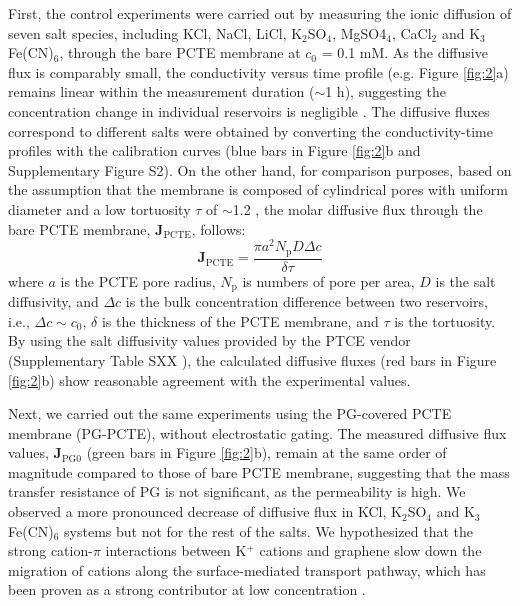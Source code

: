\documentclass[manuscript=letter, email=true, hyperref=true, keywords=false]{achemso}
\begin{document}
First, the control experiments were carried out by measuring the ionic
diffusion of seven salt species, including KCl, NaCl, LiCl,
K$_{2}$SO$_{4}$, MgSO4$_{4}$, CaCl$_{2}$ and K$_{3}$Fe(CN)$_{6}$,
through the bare PCTE membrane at $c_{0}$ = 0.1 mM. As the diffusive
flux is comparably small, the conductivity versus time profile
(e.g. Figure \ref{fig:2}a) remains linear within the measurement
duration ($\sim{}$1 h), suggesting the concentration change in
individual reservoirs is negligible . The diffusive
fluxes correspond to different salts were obtained by converting the
conductivity-time profiles with the calibration curves (blue bars in
Figure \ref{fig:2}b and Supplementary Figure S2). On the other hand,
for comparison purposes, based on the assumption that the membrane is
composed of cylindrical pores with uniform diameter and a low
tortuosity $\tau$ of $\sim{}$1.2 , the molar diffusive
flux through the bare PCTE membrane,
$\boldsymbol{J}_{\mathrm{PCTE}}$, follows:
  \begin{equation}
    \label{eq:j-pcte}
    \boldsymbol{J}_{\mathrm{PCTE}} = \frac{\pi a^{2} N_{\mathrm{p}} D \Delta c}{\delta \tau}
  \end{equation}
where $a$ is the PCTE pore radius, $N_{\mathrm{p}}$ is numbers of pore
per area, $D$ is the salt diffusivity, and $\Delta c$ is the bulk
concentration difference between two reservoirs, i.e.,
$\Delta c \sim c_{0}$, $\delta$ is the thickness of the PCTE membrane,
and $\tau$ is the tortuosity. By using the salt diffusivity values
provided by the PTCE vendor (Supplementary Table SXX ), the
calculated diffusive fluxes (red bars in Figure \ref{fig:2}b) show
reasonable agreement with the experimental values.

Next, we carried out the same experiments using the PG-covered PCTE
membrane (PG-PCTE), without electrostatic gating. The measured
diffusive flux values, $\boldsymbol{J}_{\mathrm{PG0}}$ (green bars in
Figure \ref{fig:2}b), remain at the same order of magnitude compared
to those of bare PCTE membrane, suggesting that the mass transfer
resistance of PG is not significant, as the permeability is high. We
observed a more pronounced decrease of diffusive flux in KCl, K$_{2}$SO$_{4}$
and K$_{3}$Fe(CN)$_{6}$ systems but not for the rest of the salts. We
hypothesized that the strong cation-$\pi$ interactions between K$^{+}$ cations
and graphene  slow down the migration of cations along the
surface-mediated transport pathway, which has been proven as a strong
contributor at low concentration .
\end{document}

